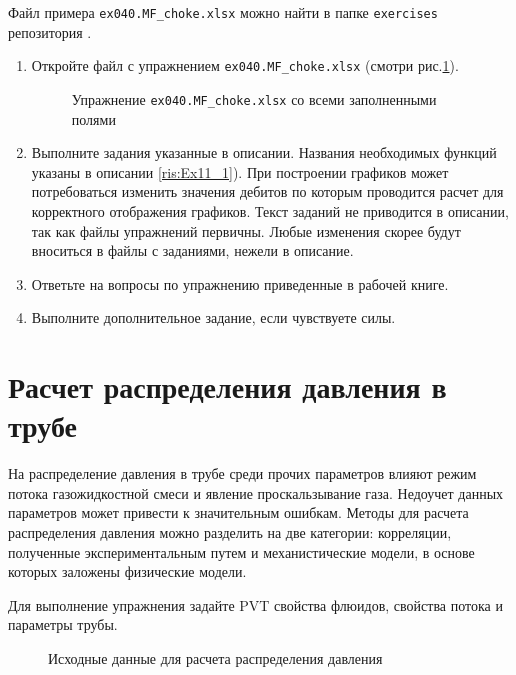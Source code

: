 Файл примера \texttt{ex040.MF_choke.xlsx} можно найти в папке \texttt{exercises} репозитория \unf{}.

\begin{enumerate}
	
	\item Откройте файл с упражнением \texttt{ex040.MF_choke.xlsx} (смотри рис.\ref{ris:Ex40_1}).
	
	\begin{figure}[h!]
		\center{\texttt{[image: Ex40\_1]}}
		\caption{Упражнение \texttt{ex040.MF_choke.xlsx} со всеми заполненными полями }
		\label{ris:Ex40_1}
	\end{figure}
	
	\item Выполните задания указанные в описании. Названия необходимых функций указаны в описании  \ref{ris:Ex11_1}). При построении графиков может потребоваться изменить значения дебитов по которым проводится расчет для корректного отображения графиков. Текст заданий не приводится в описании, так как файлы упражнений первичны. Любые изменения скорее будут вноситься в файлы с заданиями, нежели в описание. 
	
	\item Ответьте на вопросы по упражнению приведенные в рабочей книге.
	
	\item Выполните дополнительное задание, если чувствуете силы.
	
\end{enumerate}






\section{Расчет распределения давления в трубе}

На распределение давления в трубе среди прочих параметров влияют режим потока газожидкостной смеси и явление проскальзывание газа. Недоучет данных параметров может привести к значительным ошибкам. Методы для расчета распределения давления можно разделить на две категории: корреляции, полученные экспериментальным путем и механистические модели, в основе которых заложены физические модели.

Для выполнение упражнения задайте PVT свойства флюидов, свойства потока и параметры трубы.

\begin{figure}[h!]
	\center{\texttt{[image: Ex50\_1]}}
	\caption{Исходные данные для расчета распределения давления}
	\label{ris:Ex50_1}
\end{figure}

